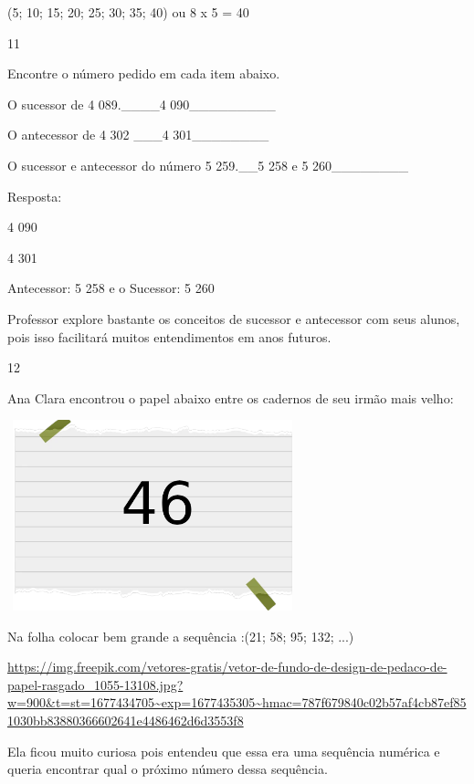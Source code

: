 \begin{escolha}
(5; 10; 15; 20; 25; 30; 35; 40) ou 8 x 5 = 40

\num{11}

Encontre o número pedido em cada item abaixo.

\begin{escolha}

\item
  O sucessor de 4 089.\_\_\_\_4 090\_\_\_\_\_\_\_\_\_
\item
  O antecessor de 4 302 \_\_\_4 301\_\_\_\_\_\_\_\_
\item
  O sucessor e antecessor do número 5 259.\_\_5 258 e 5
  260\_\_\_\_\_\_\_\_
\end{escolha}

Resposta:

\begin{escolha}

\item
  4 090
\item
  4 301
\item
  Antecessor: 5 258 e o Sucessor: 5 260
\end{escolha}

Professor explore bastante os conceitos de sucessor e antecessor com
seus alunos, pois isso facilitará muitos entendimentos em anos futuros.

\num{12}

Ana Clara encontrou o papel abaixo entre os cadernos de seu irmão mais
velho:

\includegraphics[width=3.30833in,height=2.17391in]{media/image2.png}

Na folha colocar bem grande a sequência :(21; 58; 95; 132; ...)

\url{https://img.freepik.com/vetores-gratis/vetor-de-fundo-de-design-de-pedaco-de-papel-rasgado_1055-13108.jpg?w=900\&t=st=1677434705~exp=1677435305~hmac=787f679840c02b57af4cb87ef851030bb83880366602641e4486462d6d3553f8}

Ela ficou muito curiosa pois entendeu que essa era uma sequência
numérica e queria encontrar qual o próximo número dessa sequência.


\end{escolha}
